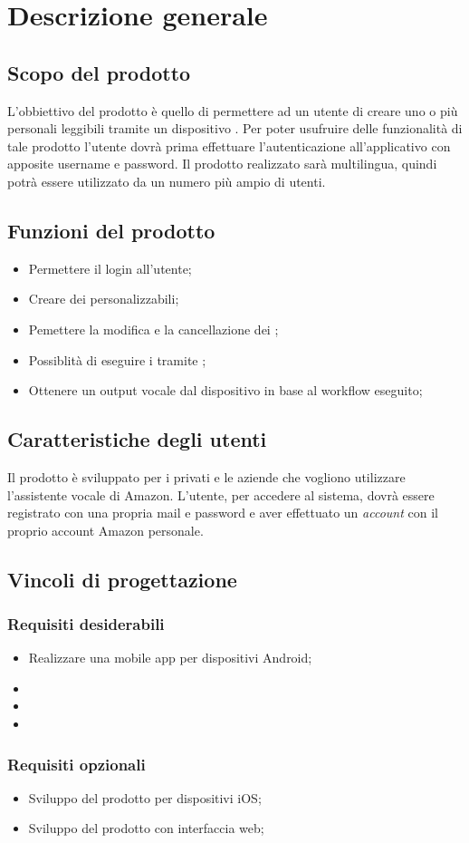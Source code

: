 \chapter{Descrizione generale}

\section{Scopo del prodotto}
L'obbiettivo del prodotto è quello di permettere ad un utente di creare uno o più  personali leggibili tramite un dispositivo .
Per poter usufruire delle funzionalità di tale prodotto l'utente dovrà prima effettuare l'autenticazione all'applicativo con apposite username e password.
Il prodotto realizzato sarà multilingua, quindi potrà essere utilizzato da un numero più ampio di utenti.


\section{Funzioni del prodotto}
\begin{itemize}
	\item Permettere il login all'utente;
	\item Creare dei  personalizzabili;
	\item Pemettere la modifica e la cancellazione dei ;
	\item Possiblità di eseguire i  tramite ; 
	\item Ottenere un output vocale dal dispositivo  in base al workflow eseguito;
\end{itemize}

\section{Caratteristiche degli utenti}
Il prodotto è sviluppato per i privati e le aziende che vogliono utilizzare l'assistente vocale  di Amazon.
L'utente, per accedere al sistema, dovrà essere registrato con una propria mail e password e aver effettuato un \textit{account}  con il proprio account Amazon personale.


\section{Vincoli di progettazione}
\subsection{Requisiti desiderabili}
\begin{itemize}
	\item Realizzare una mobile app per dispositivi Android;
	\item
	\item
	\item
\end{itemize}
\subsection{Requisiti opzionali}
\begin{itemize}
	\item Sviluppo del prodotto per dispositivi iOS;
	\item Sviluppo del prodotto con interfaccia web;
\end{itemize}